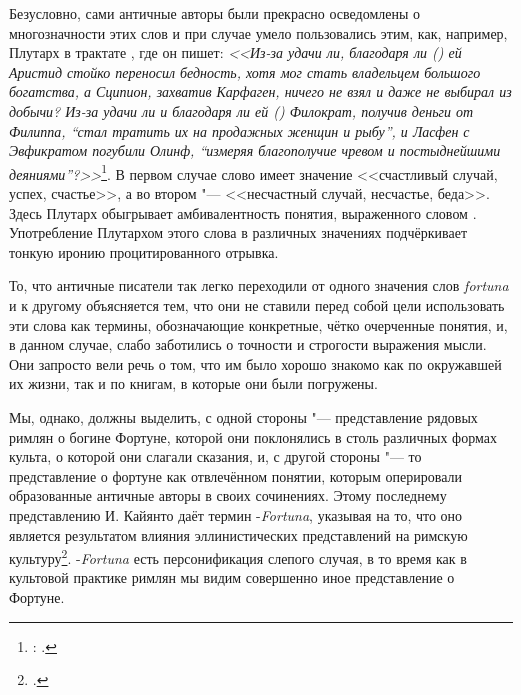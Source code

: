 Безусловно, сами античные авторы были прекрасно осведомлены о многозначности этих слов и при случае умело пользовались этим, как, например, Плутарх в трактате , где он пишет: \textit{<<Из-за удачи ли, благодаря ли () ей Аристид стойко переносил бедность, хотя мог стать владельцем большого богатства, а Сципион, захватив Карфаген, ничего не взял и даже не выбирал из добычи? Из-за удачи ли и благодаря ли ей () Филократ, получив деньги от Филиппа, ``стал тратить их на продажных женщин и рыбу'', и Ласфен с Эвфикратом погубили Олинф, ``измеряя благополучие чревом и постыднейшими деяниями''?>>}\footnote{: .}. В первом случае слово  имеет значение <<счастливый случай, успех, счастье>>, а во втором "--- <<несчастный случай, несчастье, беда>>. Здесь Плутарх обыгрывает амбивалентность понятия, выраженного словом . Употребление Плутархом этого слова в различных значениях подчёркивает тонкую иронию процитированного отрывка.


То, что античные писатели так легко переходили от одного значения слов \textit{fortuna} и  к другому объясняется тем, что они не ставили перед собой цели использовать эти слова как термины, обозначающие конкретные, чётко очерченные понятия, и, в данном случае, слабо заботились о точности и строгости выражения мысли. Они запросто вели речь о том, что им было хорошо знакомо как по окружавшей их жизни, так и по книгам, в которые они были погружены.

Мы, однако, должны выделить, с одной стороны "--- представление рядовых римлян о богине Фортуне, которой они поклонялись в столь различных формах культа, о которой они слагали сказания, и, с другой стороны "--- то представление о фортуне как отвлечённом понятии, которым оперировали образованные античные авторы в своих сочинениях. Этому последнему представлению И. Кайянто даёт термин -\textit{Fortuna}, указывая на то, что оно является результатом влияния эллинистических представлений на римскую культуру\footcite[P. 530--531]{Kajanto1981}. -\textit{Fortuna} есть персонификация слепого случая, в то время как в культовой практике римлян мы видим совершенно иное представление о Фортуне.

